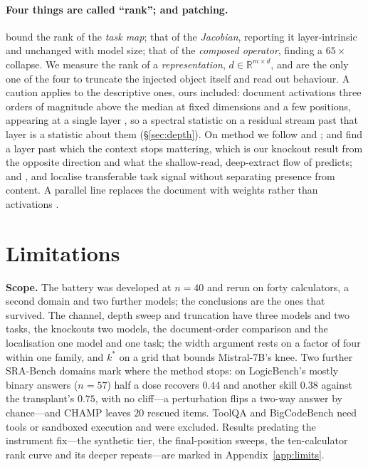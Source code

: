 \documentclass{article}
\newcommand{\dvec}{\ensuremath{d}}
\begin{document}
\paragraph{Four things are called ``rank''; and patching.}
\citet{dong2026taskvectorlimits} bound the rank of the \emph{task map};
\citet{sarkar2026causaldim} that of the \emph{Jacobian}, reporting it
layer-intrinsic and unchanged with model size;
\citet{fernando2026residualspectral} that of the \emph{composed operator},
finding a $65\times$ collapse. We measure the rank of a \emph{representation},
$\dvec\in\mathbb{R}^{m\times d}$, and are the only one of the four to truncate
the injected object itself and read out behaviour. A caution applies to the
descriptive ones, ours included: \citet{sun2024massive} document activations
three orders of magnitude above the median at fixed dimensions and a few
positions, appearing at a single layer \citep{shi2026melayer}, so a spectral
statistic on a residual stream past that layer is a statistic about them
(\S\ref{sec:depth}). On method we follow \citet{zhang2023bestpractices} and
\citet{heimersheim2024patching}; \citet{onset2025instruction} and \citet{sia2024incontexttranslation} find a
layer past which the context stops mattering, which is our knockout result from
the opposite direction and what the shallow-read, deep-extract flow of
\citet{wang2023labelwords} predicts; and \citet{jit2025taskrepr},
\citet{semanticconflicts2026} and \citet{ragcite2026} localise transferable task
signal without separating presence from content. A parallel line replaces the
document with weights rather than activations \citep{doc2lora2026,
deepcontextdistill2025}.

\section{Limitations}

\textbf{Scope.} The battery was developed at $n=40$ and rerun on forty
calculators, a second domain and two further models; the conclusions are the
ones that survived. The channel, depth sweep and truncation have three models
and two tasks, the knockouts two models, the document-order comparison and the
localisation one model and one task; the width argument rests on a factor of
four within one family, and $k^{*}$ on a grid that bounds Mistral-7B's knee. Two
further SRA-Bench domains mark where the method stops: on LogicBench's mostly
binary answers ($n=57$) half a dose recovers $0.44$ and another skill $0.38$
against the transplant's $0.75$, with no cliff---a perturbation flips a two-way
answer by chance---and CHAMP leaves $20$ rescued items. ToolQA and BigCodeBench
need tools or sandboxed execution and were excluded.
Results predating the instrument fix---the synthetic tier, the final-position
sweeps, the ten-calculator rank curve and its deeper repeats---are marked in
Appendix~\ref{app:limits}.
\end{document}
